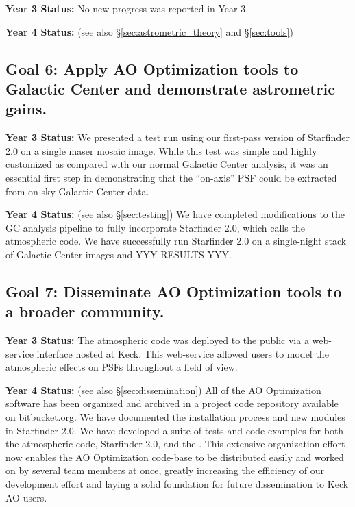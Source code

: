 \noindent
\textbf{Year 3 Status:}
No new progress was reported in Year 3.

\noindent
\textbf{Year 4 Status:}
(see also \S\ref{sec:astrometric_theory} and \S\ref{sec:tools})


\subsection{Goal 6: Apply AO Optimization tools to Galactic Center and demonstrate
  astrometric gains.}

\noindent
\textbf{Year 3 Status:}
We presented a test run using our first-pass version of Starfinder
2.0 on a single maser mosaic image. While this test was simple and highly
customized as compared with our normal Galactic Center
analysis, it was an essential first step in demonstrating that the
``on-axis'' PSF could be extracted from on-sky Galactic Center data.
 
\noindent
\textbf{Year 4 Status:}
(see also \S\ref{sec:testing})
 We have completed modifications to the GC analysis pipeline to fully
incorporate Starfinder 2.0, which calls the atmospheric code. We have
successfully run Starfinder 2.0 on a single-night stack of Galactic
Center images and YYY RESULTS YYY.


\subsection{Goal 7: Disseminate AO Optimization tools to a broader community.}

\noindent
\textbf{Year 3 Status:}
The atmospheric code was deployed to the public via a web-service
interface hosted at Keck. This web-service allowed users to model
the atmospheric effects on PSFs throughout a field of view. 

\noindent
\textbf{Year 4 Status:}
(see also \S\ref{sec:dissemination})
All of the AO Optimization software has been organized and archived in
a project code repository available on bitbucket.org. We have
documented the installation process and new modules in Starfinder
2.0. We have developed a suite of tests and code examples for both the
atmospheric code, Starfinder 2.0, and the . This extensive
organization effort now enables the AO Optimization code-base to be
distributed easily and worked on by several team members at once,
greatly increasing the efficiency of our development effort and laying
a solid foundation for future dissemination to Keck AO users.


  
  